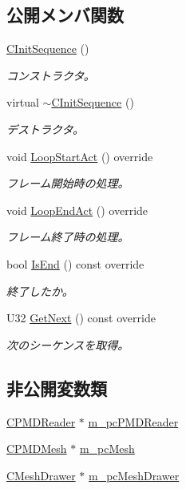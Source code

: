 \subsection*{公開メンバ関数}
\begin{DoxyCompactItemize}
\item 
\hyperlink{class_c_init_sequence_a29e4587c31c2ae19ef9cd646973bbeba}{C\+Init\+Sequence} ()
\begin{DoxyCompactList}\small\item\em コンストラクタ。 \end{DoxyCompactList}\item 
virtual \hyperlink{class_c_init_sequence_abc416fc4b10a9421767a0e5ce923d67a}{$\sim$\+C\+Init\+Sequence} ()
\begin{DoxyCompactList}\small\item\em デストラクタ。 \end{DoxyCompactList}\item 
void \hyperlink{class_c_init_sequence_a52cb5822b6f2c281f3969fadc61a47fb}{Loop\+Start\+Act} () override
\begin{DoxyCompactList}\small\item\em フレーム開始時の処理。 \end{DoxyCompactList}\item 
void \hyperlink{class_c_init_sequence_aae10f421cc1738b571022d2bdc3898d0}{Loop\+End\+Act} () override
\begin{DoxyCompactList}\small\item\em フレーム終了時の処理。 \end{DoxyCompactList}\item 
bool \hyperlink{class_c_init_sequence_ac837c22aeab7e9c10f3f9a217390661c}{Is\+End} () const  override
\begin{DoxyCompactList}\small\item\em 終了したか。 \end{DoxyCompactList}\item 
U32 \hyperlink{class_c_init_sequence_a7d4aec0184771958424f2234716a4945}{Get\+Next} () const  override
\begin{DoxyCompactList}\small\item\em 次のシーケンスを取得。 \end{DoxyCompactList}\end{DoxyCompactItemize}
\subsection*{非公開変数類}
\begin{DoxyCompactItemize}
\item 
\hyperlink{class_c_p_m_d_reader}{C\+P\+M\+D\+Reader} $\ast$ \hyperlink{class_c_init_sequence_acb2968a68f82f21b579371f0d2533863}{m\+\_\+pc\+P\+M\+D\+Reader}
\item 
\hyperlink{class_c_p_m_d_mesh}{C\+P\+M\+D\+Mesh} $\ast$ \hyperlink{class_c_init_sequence_a2a6637e5348a20fe286258e723b85d31}{m\+\_\+pc\+Mesh}
\item 
\hyperlink{class_c_mesh_drawer}{C\+Mesh\+Drawer} $\ast$ \hyperlink{class_c_init_sequence_a7581fe58f808b9490a8d65e026fd334e}{m\+\_\+pc\+Mesh\+Drawer}
\end{DoxyCompactItemize}


